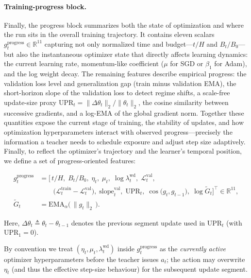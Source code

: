 \documentclass[11pt]{article}
\newcommand{\R}{\mathbb{R}}
\newcommand{\1}{\mathbf{1}}
\begin{document}
\paragraph{Training-progress block.}
Finally, the progress block summarizes both the state of optimization and where the run sits in the overall training trajectory. It contains eleven scalars
\(
g^{\text{progress}}_t\in\R^{11}
\)
capturing not only normalized time and budget---$t/H$ and $B_t/B_0$---but also the instantaneous optimizer state that directly affects learning dynamics: the current learning rate, momentum-like coefficient ($\mu$ for SGD or $\beta_1$ for Adam), and the log weight decay. The remaining features describe empirical progress: the validation loss level and generalization gap (train minus validation EMA), the short-horizon slope of the validation loss to detect regime shifts, a scale-free update-size proxy $\mathrm{UPR}_t=\|\Delta\theta_t\|_2/\|\theta_t\|_2$, the cosine similarity between successive gradients, and a log-EMA of the global gradient norm. Together these quantities expose the current stage of training, the stability of updates, and how optimization hyperparameters interact with observed progress—precisely the information a teacher needs to schedule exposure and adjust step size adaptively. Finally, to reflect the optimizer’s trajectory and the learner’s temporal position, we define a set of progress-oriented features:

\begin{equation}
\label{eq:gprogress-full}
\begin{aligned}
g^{\text{progress}}_t
&= \Big[\,
t/H,\;
B_t/B_0,\;
\eta_t,\;
\mu_t,\;
\log\lambda^{\mathrm{wd}}_t,\;
\mathcal L^{\mathrm{val}}_t,\\[-0.25em]
&\qquad
\big(\mathcal L^{\mathrm{train}}_t-\mathcal L^{\mathrm{val}}_t\big),\;
\mathrm{slope}^{\mathrm{val}}_t,\;
\mathrm{UPR}_t,\;
\cos\!\big(g_t,g_{t-1}\big),\;
\log \widetilde{G}_t
\Big]^{\!\top}\!\in\mathbb{R}^{11},\\[0.25em]
\widetilde{G}_t
&= \mathrm{EMA}_\alpha\!\big(\,\|g_t\|_2\,\big).
\end{aligned}
\end{equation}

Here, $\Delta\theta_t \triangleq \theta_t - \theta_{t-1}$ denotes the previous segment update used in $\mathrm{UPR}_t$ (with $\mathrm{UPR}_1=0$).

By convention we treat $(\eta_t,\mu_t,\lambda^{\mathrm{wd}}_t)$ inside $g^{\text{progress}}_t$ as the \emph{currently active} optimizer hyperparameters before the teacher issues $a_t$; the action may overwrite $\eta_t$ (and thus the effective step-size behaviour) for the subsequent update segment.
\end{document}
